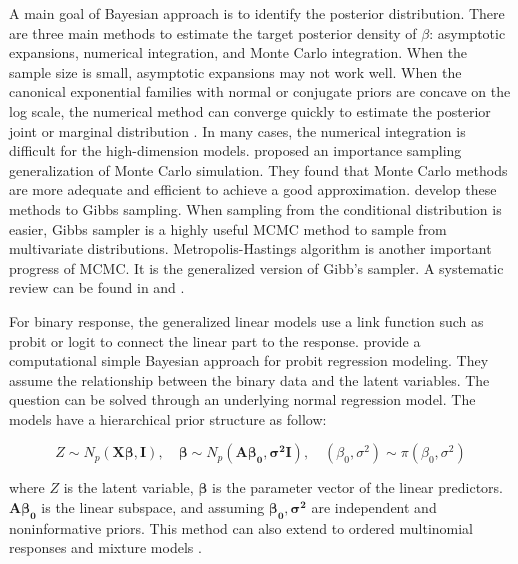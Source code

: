 \documentclass[12pt]{article}
\begin{document}
A main goal of Bayesian approach is to identify the posterior
distribution. There are three main methods to estimate the target
posterior density of \(\beta\): asymptotic expansions, numerical
integration, and Monte Carlo integration. When the sample size is small,
asymptotic expansions may not work well. When the canonical exponential
families with normal or conjugate priors are concave on the log scale,
the numerical method can converge quickly to estimate the posterior
joint or marginal distribution \citep{ohaganKendallAdvancedTheory2004}.
In many cases, the numerical integration is difficult for the
high-dimension models. \citet{zellnerBayesianAnalysisDichotomous1984}
proposed an importance sampling generalization of Monte Carlo
simulation. They found that Monte Carlo methods are more adequate and
efficient to achieve a good approximation.
\citet{gelfandSamplingBasedApproachesCalculating1990} develop these
methods to Gibbs sampling. When sampling from the conditional
distribution is easier, Gibbs sampler is a highly useful MCMC method to
sample from multivariate distributions. Metropolis-Hastings algorithm
\citep{tierneyMarkovChainsExploring1994} is another important progress
of MCMC. It is the generalized version of Gibb's sampler. A systematic
review can be found in \citet{agrestiBayesianInferenceCategorical2005}
and \citet{agrestiCategoricalDataAnalysis2012}.

For binary response, the generalized linear models use a link function
such as probit or logit to connect the linear part to the response.
\citet{albertBayesianAnalysisBinary1993} provide a computational simple
Bayesian approach for probit regression modeling. They assume the
relationship between the binary data and the latent variables. The
question can be solved through an underlying normal regression model.
The models have a hierarchical prior structure as follow:

\[Z\sim N_p(\boldsymbol{X\beta,I}),\quad \boldsymbol{\beta}\sim N_p(\boldsymbol{A\beta_0,\sigma^2I}), \quad (\beta_0,\sigma^2)\sim \pi(\beta_0,\sigma^2)\]

where \(Z\) is the latent variable, \(\boldsymbol{\beta}\) is the
parameter vector of the linear predictors. \(\boldsymbol{A\beta_0}\) is
the linear subspace, and assuming \(\boldsymbol{\beta_0,\sigma^2}\) are
independent and noninformative priors. This method can also extend to
ordered multinomial responses and mixture models
\citep{hoffFirstCourseBayesian2009, gelmanBayesianDataAnalysis2020}.
\end{document}
